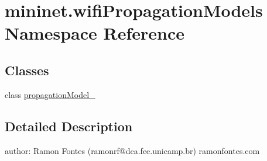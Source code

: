 \hypertarget{namespacemininet_1_1wifiPropagationModels}{\section{mininet.\-wifi\-Propagation\-Models Namespace Reference}
\label{namespacemininet_1_1wifiPropagationModels}
}
\subsection*{Classes}
\begin{DoxyCompactItemize}
\item 
class \hyperlink{classmininet_1_1wifiPropagationModels_1_1propagationModel__}{propagation\-Model\-\_\-}
\end{DoxyCompactItemize}


\subsection{Detailed Description}
\begin{DoxyVerb}author: Ramon Fontes (ramonrf@dca.fee.unicamp.br)
ramonfontes.com\end{DoxyVerb}
 